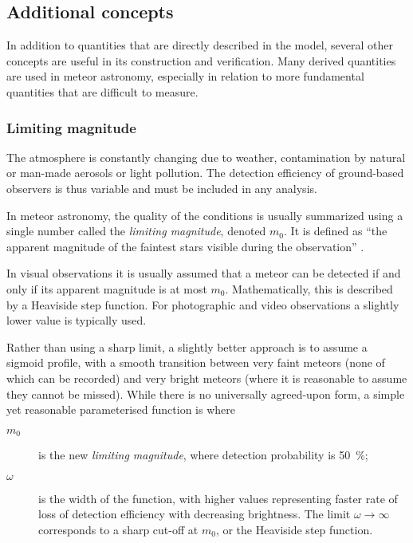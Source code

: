     \subsection{Additional concepts} \label{msa}
        In addition to quantities that are directly described in the model, several other concepts are useful
        in its construction and verification. Many derived quantities are used in meteor astronomy,
        especially in relation to more fundamental quantities that are difficult to measure.

        \subsubsection{Limiting magnitude} \label{msam}
            The atmosphere is constantly changing due to weather, contamination
            by natural or man-made aerosols or light pollution. The detection efficiency
            of ground-based observers is thus variable and must be included in any analysis.

            In meteor astronomy, the quality of the conditions is usually summarized
            using a single number called the \emph{limiting magnitude}, denoted $m_0$.
            It is defined as ``the apparent magnitude of the faintest stars visible during the observation'' \citep{imo-glossary}.

            In visual observations it is usually assumed that a meteor can be detected if and only if
            its apparent magnitude is at most $m_0$. Mathematically, this is described by a Heaviside step function.
            For photographic and video observations a slightly lower value is typically used.

            Rather than using a sharp limit, a slightly better approach is to assume a sigmoid profile,
            with a smooth transition between very faint meteors (none of which can be recorded)
            and very bright meteors (where it is reasonable to assume they cannot be missed).
            While there is no universally agreed-upon form, a simple yet reasonable parameterised function is
            where
            \begin{description}
                \item[$m_0$]    is the new \emph{limiting magnitude}, where detection probability is \SI{50}{\percent};
                \item[$\omega$] is the width of the function, with higher values representing
                    faster rate of loss of detection efficiency with decreasing brightness.
                    The limit $\omega \to \infty$ corresponds to a sharp cut-off at $m_0$,
                    or the Heaviside step function.
            \end{description}

